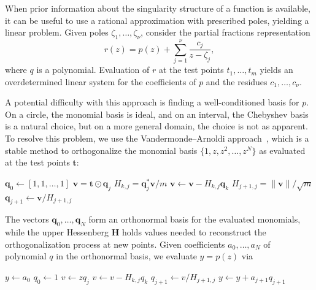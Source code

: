 \documentclass{juliacon}
\begin{document}
When prior information about the singularity structure of a function is available, it can be useful to use a rational approximation with prescribed poles, yielding a linear problem. Given poles $\zeta_1,\ldots,\zeta_\nu$, consider the partial fractions representation
\begin{equation}
    \label{eq:parfrac}
    r(z) = p(z) + \sum_{j=1}^\nu \frac{c_j}{z - \zeta_j},
\end{equation}
where $q$ is a polynomial. Evaluation of $r$ at the test points $t_1,\ldots,t_m$ yields an overdetermined linear system for the coefficients of $p$ and the residues $c_1,\ldots,c_\nu$.

A potential difficulty with this approach is finding a well-conditioned basis for $p$. On a circle, the monomial basis is ideal, and on an interval, the Chebyshev basis is a natural choice, but on a more general domain, the choice is not as apparent. To resolve this problem, we use the Vandermonde–Arnoldi approach~\cite{BrubeckVandermondeArnoldi2021}, which is a stable method to orthogonalize the monomial basis $\{1,z,z^2,\ldots,z^{N}\}$ as evaluated at the test points $\bm{t}$:
\begin{algorithmic}
    \State $\bm{q}_0 \gets [1,1,\ldots,1]$ 
        \State $\bm{v} = \bm{t} \odot \bm{q}_{j}$ 
            \State $H_{k,j} = \bm{q}_j^* \bm{v} / m$ 
            \State $\bm{v} \gets \bm{v} - H_{k,j} \bm{q}_k$ 
        \EndFor
        \State $H_{j+1,j} = \| \bm{v} \| / \sqrt{m}$ 
        \State $\bm{q}_{j+1} \gets \bm{v} / H_{j+1,j}$ 
    \EndFor
\end{algorithmic}
The vectors $\bm{q}_0,\ldots,\bm{q}_N$ form an orthonormal basis for the evaluated monomials, while the upper Hessenberg $\bm{H}$ holds values needed to reconstruct the orthogonalization process at new points. Given coefficients $a_0,\ldots,a_N$ of polynomial $q$ in the orthonormal basis, we evaluate $y=p(z)$ via
\begin{algorithmic}
    \State $y \gets a_0$
    \State $q_0 \gets 1$
        \State $v \gets z q_j$
            \State $v \gets v - H_{k,j} q_k$ 
        \EndFor
        \State $q_{j+1} \gets v / {H}_{j+1,j}$ 
        \State $y \gets y + a_{j+1} q_{j+1}$ 
    \EndFor
\end{algorithmic}
\end{document}
